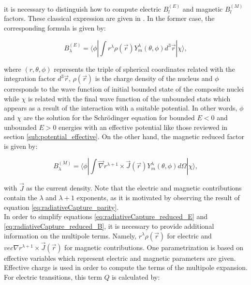 \documentclass[openany]{book}
\begin{document}
 it is necessary to distinguish how to compute electric $B^{(E)}_{l}$ and magnetic $B^{(M)}_{l}$ factors. These classical expression are given in \cite{goldhaber_weneser_1955}. In the former case, the corresponding formula is given by: 

\begin{equation} \label{eq:radiativeCapture_reduced_E}
	B^{(E)}_{\lambda} =   \langle \phi  |  \int  r^\lambda \rho(\vec r) Y^{\lambda}_{m} (\theta, \phi) d^3 \vec r | \chi \rangle, 
\end{equation}

where $(r, \theta, \phi)$ represents the triple of spherical coordinates related with the integration factor $d^3 \vec r $,  $\rho(\vec r)$ is the charge density of the nucleus and
$\phi$ corresponds to the wave function of initial bounded state of the composite nuclei while $\chi$ is related with the final wave function of the unbounded stats which appears as a result of the interaction with a suitable potential.  In other words, $\phi$ and $\chi$ are the solution for the Schrödinger equation for bounded $E < 0 $ and unbounded $E > 0$ energies with an effective potential like those reviewed in section \ref{sub:potential_effective}. On the other hand, the magnetic reduced factor is given by: 

\begin{equation} \label{eq:radiativeCapture_reduced_B}
	B^{(M)}_{\lambda} =  \langle  \phi  |  \int  \vec \nabla r^{\lambda+1} \times \vec J (\vec r) Y^{\lambda}_{m} (\theta, \phi) d \Omega |   \chi  \rangle,  
\end{equation}

with $\vec J$ as the current density.  Note that the electric and magnetic contributions contain the $\lambda$ and $\lambda + 1$ exponents, as it is motivated by observing the result of equation \ref{eq:radiativeCapture_parity}. \\

In order to simplify equations \ref{eq:radiativeCapture_reduced_E} and 
\ref{eq:radiativeCapture_reduced_B}, it is necessary to provide additional information on the multipole terms. Namely, $  r^\lambda \rho(\vec r)$ for electric and $vec \nabla r^{\lambda+1} \times \vec J (\vec r)$ for magnetic contributions. One parametrization is based on effective variables which represent electric and magnetic parameters are given. Effective charge is used in order to compute the terms of the multipole expansion. For electric transitions, this term $Q$ is calculated by:
\end{document}
